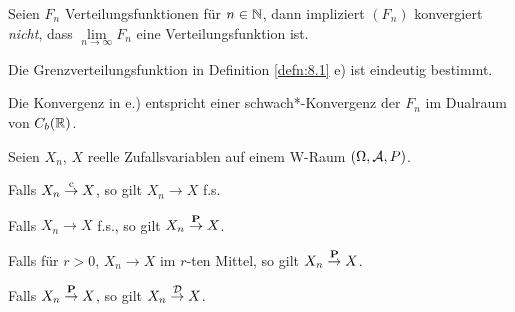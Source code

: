 \begin{bem}[Bemerkungen.]
\label{bem:8.1}
\begin{bemenum}
  \item Seien $F_n$ Verteilungsfunktionen für $n\in\N$, dann impliziert $(F_n)$
  konvergiert \textit{nicht}, dass $\lim\limits_{n\to\infty} F_n$ eine
  Verteilungsfunktion ist.
  \item Die Grenzverteilungsfunktion in Definition \ref{defn:8.1} e) ist
  eindeutig bestimmt.
  \item Die Konvergenz in e.) entspricht einer
  schwach*-Konvergenz der $F_n$ im Dualraum von $C_b(\R)$.\maphere
\end{bemenum}
\end{bem}

\begin{prop}
\label{prop:8.1}
Seien $X_n$, $X$ reelle Zufallsvariablen auf einem W-Raum $(\Omega,\AA,P)$.
\begin{propenum}
  \item Falls $X_n\cto X$, so gilt $X_n\to X$ f.s.
  \item Falls $X_n\to X$ f.s., so gilt $X_n\Pto X$.
  \item Falls für $r> 0$, $X_n\to X$ im $r$-ten Mittel, so gilt $X_n\Pto X$.
  \item Falls $X_n\Pto X$, so gilt $X_n\Dto X$.\fishhere
\end{propenum}
\end{prop}
